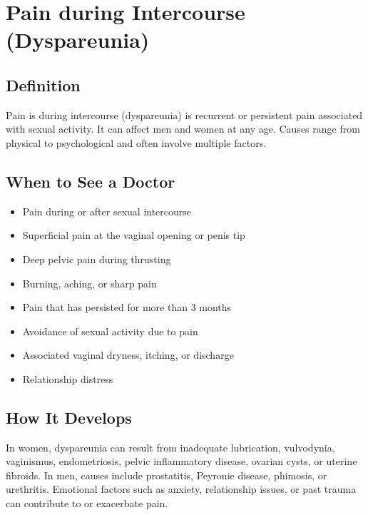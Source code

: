 \chapter{Pain during Intercourse (Dyspareunia)}

\section*{Definition}
Pain is during intercourse (dyspareunia) is recurrent or persistent pain associated with sexual activity. It can affect men and women at any age. Causes range from physical to psychological and often involve multiple factors.

\section*{When to See a Doctor}
\begin{itemize}
\item Pain during or after sexual intercourse
\item Superficial pain at the vaginal opening or penis tip
\item Deep pelvic pain during thrusting
\item Burning, aching, or sharp pain
\item Pain that has persisted for more than 3 months
\item Avoidance of sexual activity due to pain
\item Associated vaginal dryness, itching, or discharge
\item Relationship distress
\end{itemize}

\section*{How It Develops}
In women, dyspareunia can result from inadequate lubrication, vulvodynia, vaginismus, endometriosis, pelvic inflammatory disease, ovarian cysts, or uterine fibroids. In men, causes include prostatitis, Peyronie disease, phimosis, or urethritis. Emotional factors such as anxiety, relationship issues, or past trauma can contribute to or exacerbate pain.

